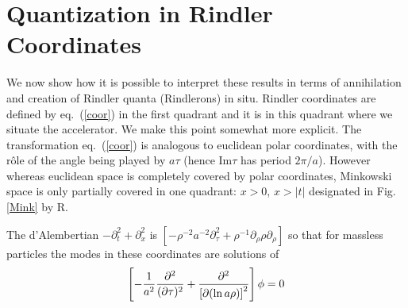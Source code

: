 \documentclass[12pt,oneside]{report}
\begin{document}
\section{Quantization in Rindler Coordinates}\label{quantization}
We now show how it is possible to interpret these results in terms of
annihilation and creation of Rindler quanta (Rindlerons) in situ. Rindler
coordinates are defined by eq.~(\ref{coor}) in the first quadrant and it is in
this quadrant where we situate the accelerator. We make this point somewhat more
explicit. The transformation eq.~(\ref{coor}) is analogous to euclidean polar
coordinates, with the r\^ole of the angle being played by $a \tau$
(hence Im$\tau$ has period $2\pi/a$). However
whereas euclidean space is completely covered by polar coordinates, Minkowski
space is only partially covered in one quadrant: $x>0$, $x> \vert t \vert$
designated in Fig. \ref{Mink} by R.

The d'Alembertian $-\partial_t^2 + \partial_x^2$ is 
$[-\rho^{-2} a^{-2} \partial^2_\tau + \rho^{-1} \partial_\rho \rho
\partial_\rho]$ so that for massless particles the modes in these coordinates
are solutions of 
\begin{equation}
\left[
-{1 \over a^2} {\partial^2 \over (\partial \tau)^2} + 
{\partial^2 \over \left[ \partial ({\ln a \rho})\right]^2} \right] \phi =0
\label{eqone}
\end{equation}
\end{document}
